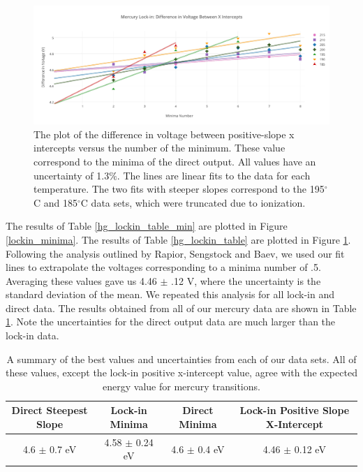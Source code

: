 \documentclass[prb,preprint]{revtex4-1}
\begin{document}
\begin{figure}[h!]
\centering

\includegraphics[width=6in]{lockin_intercepts.pdf}
\caption{The plot of the difference in voltage between positive-slope x intercepts versus the number of the minimum. These value correspond to the minima of the direct output. All values have an uncertainty of 1.3$\%$. The lines are linear fits to the data for each temperature. The two fits with steeper slopes correspond to the 195$^{\circ}$C and 185$^{\circ}$C data sets, which were truncated due to ionization.}

\label{lockin_intercepts}
\end{figure}


The results of Table \ref{hg_lockin_table_min} are plotted in Figure \ref{lockin_minima}. The results of Table \ref{hg_lockin_table} are plotted in Figure \ref{lockin_intercepts}. Following the analysis outlined by Rapior, Sengstock and Baev, we used our fit lines to extrapolate the voltages corresponding to a minima number of .5. Averaging these values gave us 4.46 $\pm$ .12 V, where the uncertainty is the standard deviation of the mean. We repeated this analysis for all lock-in and direct data. The results obtained from all of our mercury data are shown in Table \ref{hg_results}. Note the uncertainties for the direct output data are much larger than the lock-in data.  


\begin{table}[h!]
\centering
\caption{A summary of the best values and uncertainties from each of our data sets. All of these values, except the lock-in positive x-intercept value, agree with the expected energy value for mercury transitions.}
\begin{ruledtabular}
\begin{tabular}{c c c c}
 Direct Steepest Slope & Lock-in Minima & Direct Minima & Lock-in Positive Slope X-Intercept   \\
\hline	%

 4.6 $\pm$ 0.7 eV & 4.58 $\pm$ 0.24 eV & 4.6 $\pm$ 0.4 eV & 4.46 $\pm$ 0.12 eV  \\

\end{tabular}
\end{ruledtabular}
\label{hg_results}
\end{table}
\end{document}
